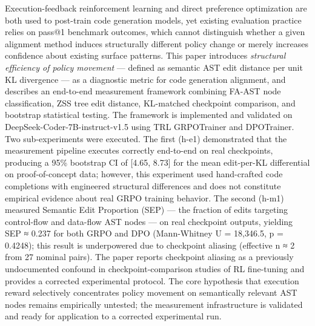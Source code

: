 
Execution-feedback reinforcement learning and direct preference optimization are both used to post-train code generation models, yet existing evaluation practice relies on pass@1 benchmark outcomes, which cannot distinguish whether a given alignment method induces structurally different policy change or merely increases confidence about existing surface patterns. This paper introduces \textit{structural efficiency of policy movement} — defined as semantic AST edit distance per unit KL divergence — as a diagnostic metric for code generation alignment, and describes an end-to-end measurement framework combining FA-AST node classification, ZSS tree edit distance, KL-matched checkpoint comparison, and bootstrap statistical testing. The framework is implemented and validated on DeepSeek-Coder-7B-instruct-v1.5 using TRL GRPOTrainer and DPOTrainer. Two sub-experiments were executed. The first (h-e1) demonstrated that the measurement pipeline executes correctly end-to-end on real checkpoints, producing a 95\% bootstrap CI of [4.65, 8.73] for the mean edit-per-KL differential on proof-of-concept data; however, this experiment used hand-crafted code completions with engineered structural differences and does not constitute empirical evidence about real GRPO training behavior. The second (h-m1) measured Semantic Edit Proportion (SEP) — the fraction of edits targeting control-flow and data-flow AST nodes — on real checkpoint outputs, yielding SEP ≈ 0.237 for both GRPO and DPO (Mann-Whitney U = 18,346.5, p = 0.4248); this result is underpowered due to checkpoint aliasing (effective n ≈ 2 from 27 nominal pairs). The paper reports checkpoint aliasing as a previously undocumented confound in checkpoint-comparison studies of RL fine-tuning and provides a corrected experimental protocol. The core hypothesis that execution reward selectively concentrates policy movement on semantically relevant AST nodes remains empirically untested; the measurement infrastructure is validated and ready for application to a corrected experimental run.
